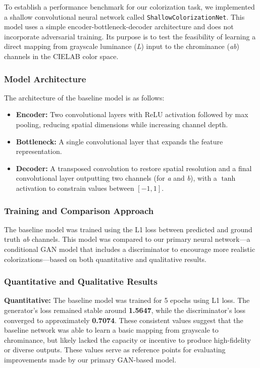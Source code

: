 \documentclass{article} %
\begin{document}
To establish a performance benchmark for our colorization task, we implemented a shallow convolutional neural network called \texttt{ShallowColorizationNet}. This model uses a simple 
encoder-bottleneck-decoder architecture and does not incorporate adversarial training. Its purpose is to test the feasibility of learning a direct mapping from grayscale luminance (\textit{L}) 
input to the chrominance (\textit{ab}) channels in the CIELAB color space.

\subsubsection{Model Architecture}

The architecture of the baseline model is as follows:
\begin{itemize}
    \item \textbf{Encoder:} Two convolutional layers with ReLU activation followed by max pooling, reducing spatial dimensions while increasing channel depth.
    \item \textbf{Bottleneck:} A single convolutional layer that expands the feature representation.
    \item \textbf{Decoder:} A transposed convolution to restore spatial resolution and a final convolutional layer outputting two channels (for \textit{a} and \textit{b}), with a $\tanh$ 
    activation to constrain values between $[-1, 1]$.
\end{itemize}

\subsubsection{Training and Comparison Approach}

The baseline model was trained using the L1 loss between predicted and ground truth \textit{ab} channels. This model was compared to our primary neural network—a conditional 
GAN model that includes a discriminator to encourage more realistic colorizations—based on both quantitative and qualitative results.

\subsubsection{Quantitative and Qualitative Results}

\textbf{Quantitative:} The baseline model was trained for 5 epochs using L1 loss. The generator's loss remained stable around \textbf{1.5647}, while the discriminator's loss 
converged to approximately \textbf{0.7074}. These consistent values suggest that the baseline network was able to learn a basic mapping from grayscale to chrominance, but likely 
lacked the capacity or incentive to produce high-fidelity or diverse outputs. These values serve as reference points for evaluating improvements made by our primary GAN-based model.
\end{document}
